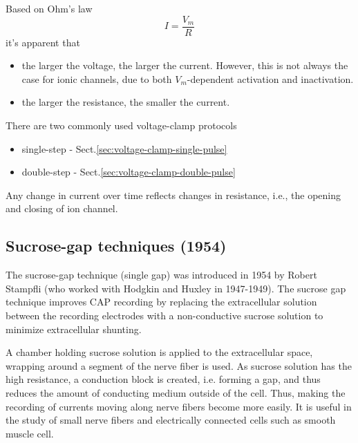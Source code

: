 Based on Ohm's law
\begin{equation}
I = \frac{V_m}{R}
\end{equation}
it's apparent that
\begin{itemize}
  \item  the larger the voltage, the larger the current. However, this
is not always the case for ionic channels, due to both $V_m$-dependent
activation and inactivation.

  \item the larger the resistance, the smaller the current.

\end{itemize}



There are two commonly used voltage-clamp protocols
\begin{itemize}
  \item single-step - Sect.\ref{sec:voltage-clamp-single-pulse}
  \item double-step - Sect.\ref{sec:voltage-clamp-double-pulse}
\end{itemize}
Any change in current over time reflects changes in resistance, i.e., the
opening and closing of ion channel.

\subsection{Sucrose-gap techniques (1954)}
\label{sec:sucr-gap-techn}

The sucrose-gap technique (single gap) was introduced in 1954 by Robert Stampfli
(who worked with Hodgkin and Huxley in 1947-1949).
The sucrose gap technique improves CAP recording by replacing the extracellular
solution between the recording electrodes with a non-conductive sucrose solution
to minimize extracellular shunting.


A chamber holding sucrose solution is applied to the extracellular space,
wrapping around a segment of the nerve fiber is used. As sucrose solution has
the high resistance, a conduction block is created, i.e. forming a gap, and thus
reduces the amount of conducting medium outside of the cell. Thus, making the
recording of currents moving along nerve fibers become more easily. It is useful
in the study of small nerve fibers and electrically connected cells such as
smooth muscle cell.

